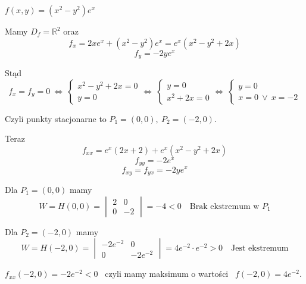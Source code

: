 \begin{przyklad}
    $ f(x,y) = (x^2 - y^2)e^x $
    
    Mamy $ D_f = \mathbb{R}^2 $ oraz
    $$ f_x = 2xe^x + (x^2 - y^2)e^x = e^x(x^2 - y^2 + 2x) $$
    $$ f_y = -2ye^x $$

    Stąd
    $$ f_x = f_y = 0 \ \Leftrightarrow \ \begin{cases} x^2 - y^2 + 2x = 0 \\ y = 0 \end{cases} \Leftrightarrow \
    \begin{cases} y = 0 \\ x^2 + 2x = 0 \end{cases} \Leftrightarrow \ \begin{cases} y = 0 \\ x = 0 \ \lor \ x=-2 \end{cases} $$

    Czyli punkty stacjonarne to $ P_1 = (0,0), \ P_2 = (-2, 0) $.

    Teraz
    $$ f_{xx} = e^x(2x + 2) + e^x(x^2 - y^2 + 2x) $$
    $$ f_{yy} = -2e^x $$
    $$ f_{xy} = f_{yx} = -2ye^x $$

    Dla $ P_1 = (0,0) $ mamy
    $$ W = H(0,0) = \begin{vmatrix} 2 & 0 \\ 0 & -2 \end{vmatrix} = -4 < 0 \quad \textrm{Brak ekstremum w } P_1 $$

    Dla $ P_2 = (-2, 0) $ mamy
    $$ W = H(-2,0) = \begin{vmatrix} -2e^{-2} & 0 \\ 0 & -2e^{-2} \end{vmatrix} = 4e^{-2} \cdot e^{-2} > 0 \quad \textrm{Jest ekstremum} $$

    $ f_{xx}(-2, 0) = -2e^{-2} < 0 $ \ czyli mamy maksimum o wartości \ $ f(-2, 0) = 4e^{-2} $.
\end{przyklad}

